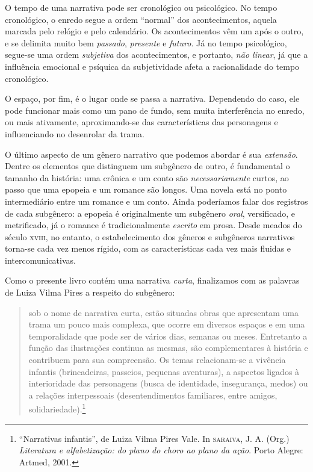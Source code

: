 \documentclass[11pt]{extarticle}
\begin{document}
O tempo de uma narrativa pode ser cronológico ou psicológico.
No tempo cronológico, o enredo segue a ordem ``normal'' dos acontecimentos,
aquela marcada pelo relógio e pelo calendário. Os acontecimentos vêm um após o 
outro, e se delimita muito bem \textit{passado}, \textit{presente} e \textit{futuro}.
Já no tempo psicológico, segue-se uma ordem \textit{subjetiva} dos acontecimentos, 
e portanto, \textit{não linear}, já que a influência emocional e psíquica 
da subjetividade afeta a racionalidade do tempo cronológico. 

O espaço, por fim, é o lugar onde se passa a narrativa. Dependendo do caso, 
ele pode funcionar mais como um pano de fundo, sem muita interferência
no enredo, ou mais ativamente, aproximando-se das características das personagens
e influenciando no desenrolar da trama. 

O último aspecto de um gênero narrativo que podemos abordar é sua 
\textit{extensão}. Dentre os elementos que distinguem um subgênero 
de outro, é fundamental o tamanho da história: uma crônica e um conto são \textit{necessariamente}
curtos, ao passo que uma epopeia e um romance são longos. Uma novela
está no ponto intermediário entre um romance e um conto.
Ainda poderíamos falar dos registros de cada subgênero: 
a epopeia é originalmente um subgênero \textit{oral}, versificado, e metrificado,
já o romance é tradicionalmente \textit{escrito} em prosa. 
Desde meados do século \textsc{xviii}, no entanto, o estabelecimento
dos gêneros e subgêneros narrativos torna-se cada vez menos rígido,
com as características cada vez mais fluidas e intercomunicativas.

Como o presente livro contém uma narrativa \textit{curta},
finalizamos com as palavras de Luiza Vilma Pires a respeito do
subgênero:

\begin{quote}
sob o nome de narrativa curta, estão situadas obras que apresentam uma trama 
um pouco mais complexa, que ocorre em diversos espaços e em uma temporalidade 
que pode ser de vários dias, semanas ou meses. Entretanto a função das ilustrações 
continua as mesmas, são complementares à história e contribuem para sua compreensão. 
Os temas relacionam-se a vivência infantis (brincadeiras, passeios, pequenas aventuras), 
a aspectos ligados à interioridade das personagens (busca de identidade, insegurança, 
medos) ou a relações interpessoais (desentendimentos familiares, entre amigos, solidariedade).\footnote{“Narrativas infantis”, de Luiza Vilma Pires Vale. In \textsc{saraiva}, J. A. (Org.) \textit{Literatura e alfabetização: do plano do choro ao plano da ação}. Porto Alegre: Artmed, 2001.} 
\end{quote} 
\end{document}
